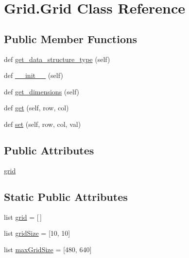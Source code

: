 \hypertarget{class_grid_1_1_grid}{}\section{Grid.\+Grid Class Reference}
\label{class_grid_1_1_grid}
\subsection*{Public Member Functions}
\begin{DoxyCompactItemize}
\item 
def \hyperlink{class_grid_1_1_grid_aa5fda75ff87deb0bc314f46f37c32bbe}{get\+\_\+data\+\_\+structure\+\_\+type} (self)
\item 
def \hyperlink{class_grid_1_1_grid_ae7e2212c7a857bb888cf441095371e8a}{\+\_\+\+\_\+init\+\_\+\+\_\+} (self)
\item 
def \hyperlink{class_grid_1_1_grid_af5c7fb19e9c77314c07466fd2cae21fd}{get\+\_\+dimensions} (self)
\item 
def \hyperlink{class_grid_1_1_grid_a70d24548a9294179bf206f69cb6020fc}{get} (self, row, col)
\item 
def \hyperlink{class_grid_1_1_grid_aa796dcf3bd8872527537675a3691efc7}{set} (self, row, col, val)
\end{DoxyCompactItemize}
\subsection*{Public Attributes}
\begin{DoxyCompactItemize}
\item 
\hyperlink{class_grid_1_1_grid_ae40cd99c22229917de9d8809eb7c9a10}{grid}
\end{DoxyCompactItemize}
\subsection*{Static Public Attributes}
\begin{DoxyCompactItemize}
\item 
list \hyperlink{class_grid_1_1_grid_ada88ff869817a4d998885417f23abf37}{grid} = \mbox{[}$\,$\mbox{]}
\item 
list \hyperlink{class_grid_1_1_grid_a0e53d7466c48b288fb28deef2b870742}{grid\+Size} = \mbox{[}10, 10\mbox{]}
\item 
list \hyperlink{class_grid_1_1_grid_a4299841d081e91e31c4c86dc38bb7829}{max\+Grid\+Size} = \mbox{[}480, 640\mbox{]}
\end{DoxyCompactItemize}


